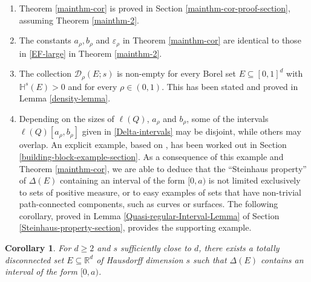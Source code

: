 \documentclass[a4paper,11pt]{amsart}
\newtheorem{cor}[thm]{\bf Corollary}
\numberwithin{equation}{section}
\begin{document}
\begin{enumerate}[1.]
\item Theorem \ref{mainthm-cor} is proved in Section \ref{mainthm-cor-proof-section}, assuming Theorem \ref{mainthm-2}. 
\vskip0.1in
\item The constants $a_{\rho}, b_{\rho}$ and $\varepsilon_{\rho}$ in Theorem \ref{mainthm-cor} are identical to those in \eqref{EF-large} in Theorem \ref{mainthm-2}. 
\vskip0.1in 
\item The collection $\mathcal D_{\rho}(E;s)$ is non-empty for every Borel set $E \subseteq [0,1]^d$ with $\mathbb H^s(E) > 0$ and for every $\rho \in (0,1)$. This has been stated and proved in Lemma \ref{density-lemma}.
\vskip0.1in 
\item Depending on the sizes of $\ell(Q)$, $a_{\rho}$ and $b_{\rho}$, some of the intervals $\ell(Q)[a_{\rho},b_{\rho}]$ given in \eqref{Delta-intervals} may be disjoint, while others may overlap. An explicit example, based on \cite[Theorem 2.4]{Falconer-1986}, has been worked out in Section \ref{building-block-example-section}.  As a consequence of this example and Theorem \ref{mainthm-cor}, we are able to deduce that the ``Steinhaus property'' of $\Delta(E)$ containing an interval of the form $[0, a)$ is not limited exclusively to sets of positive measure, or to easy examples of sets that have non-trivial path-connected components, such as curves or surfaces. The following corollary, proved in Lemma \ref{Quasi-regular-Interval-Lemma} of Section \ref{Steinhaus-property-section}, provides the supporting example. 
\end{enumerate}
\begin{cor} \label{Steinhaus-sparse-corollary}
For $d \geq 2$ and $s$ sufficiently close to $d$, there exists a totally disconnected set $E \subseteq \mathbb R^d$ of Hausdorff dimension $s$ such that $\Delta(E)$ contains an interval of the form $[0, a)$. 
\end{cor} 
\end{document}
